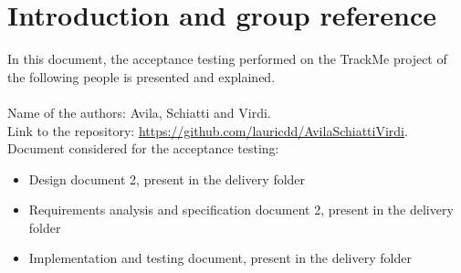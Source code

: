 \section{Introduction and group reference}
In this document, the acceptance testing performed on the TrackMe project of the following people is presented and explained. \\ \\
Name of the authors: Avila, Schiatti and Virdi.  \\
Link to the repository: \url{https://github.com/lauricdd/AvilaSchiattiVirdi}. \\
Document considered for the acceptance testing:
\begin{itemize}
\item Design document 2, present in the delivery folder
\item Requirements analysis and specification document 2, present in the delivery folder
\item Implementation and testing document, present in the delivery folder
\end{itemize}

